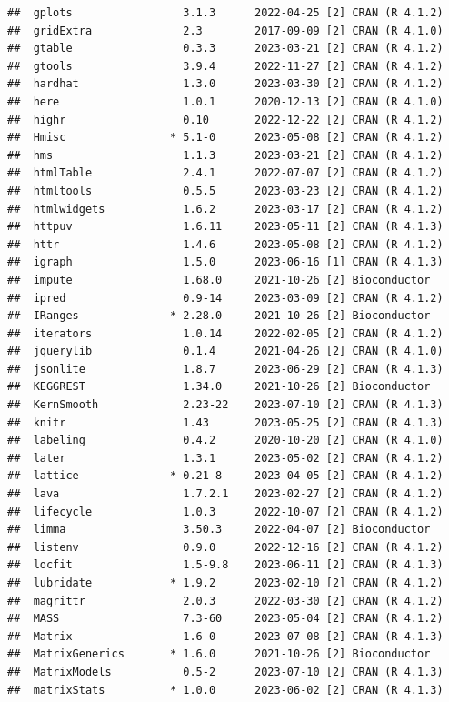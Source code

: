 \documentclass[
]{book}
\begin{document}
\begin{verbatim}
##  gplots                 3.1.3      2022-04-25 [2] CRAN (R 4.1.2)
##  gridExtra              2.3        2017-09-09 [2] CRAN (R 4.1.0)
##  gtable                 0.3.3      2023-03-21 [2] CRAN (R 4.1.2)
##  gtools                 3.9.4      2022-11-27 [2] CRAN (R 4.1.2)
##  hardhat                1.3.0      2023-03-30 [2] CRAN (R 4.1.2)
##  here                   1.0.1      2020-12-13 [2] CRAN (R 4.1.0)
##  highr                  0.10       2022-12-22 [2] CRAN (R 4.1.2)
##  Hmisc                * 5.1-0      2023-05-08 [2] CRAN (R 4.1.2)
##  hms                    1.1.3      2023-03-21 [2] CRAN (R 4.1.2)
##  htmlTable              2.4.1      2022-07-07 [2] CRAN (R 4.1.2)
##  htmltools              0.5.5      2023-03-23 [2] CRAN (R 4.1.2)
##  htmlwidgets            1.6.2      2023-03-17 [2] CRAN (R 4.1.2)
##  httpuv                 1.6.11     2023-05-11 [2] CRAN (R 4.1.3)
##  httr                   1.4.6      2023-05-08 [2] CRAN (R 4.1.2)
##  igraph                 1.5.0      2023-06-16 [1] CRAN (R 4.1.3)
##  impute                 1.68.0     2021-10-26 [2] Bioconductor
##  ipred                  0.9-14     2023-03-09 [2] CRAN (R 4.1.2)
##  IRanges              * 2.28.0     2021-10-26 [2] Bioconductor
##  iterators              1.0.14     2022-02-05 [2] CRAN (R 4.1.2)
##  jquerylib              0.1.4      2021-04-26 [2] CRAN (R 4.1.0)
##  jsonlite               1.8.7      2023-06-29 [2] CRAN (R 4.1.3)
##  KEGGREST               1.34.0     2021-10-26 [2] Bioconductor
##  KernSmooth             2.23-22    2023-07-10 [2] CRAN (R 4.1.3)
##  knitr                  1.43       2023-05-25 [2] CRAN (R 4.1.3)
##  labeling               0.4.2      2020-10-20 [2] CRAN (R 4.1.0)
##  later                  1.3.1      2023-05-02 [2] CRAN (R 4.1.2)
##  lattice              * 0.21-8     2023-04-05 [2] CRAN (R 4.1.2)
##  lava                   1.7.2.1    2023-02-27 [2] CRAN (R 4.1.2)
##  lifecycle              1.0.3      2022-10-07 [2] CRAN (R 4.1.2)
##  limma                  3.50.3     2022-04-07 [2] Bioconductor
##  listenv                0.9.0      2022-12-16 [2] CRAN (R 4.1.2)
##  locfit                 1.5-9.8    2023-06-11 [2] CRAN (R 4.1.3)
##  lubridate            * 1.9.2      2023-02-10 [2] CRAN (R 4.1.2)
##  magrittr               2.0.3      2022-03-30 [2] CRAN (R 4.1.2)
##  MASS                   7.3-60     2023-05-04 [2] CRAN (R 4.1.2)
##  Matrix                 1.6-0      2023-07-08 [2] CRAN (R 4.1.3)
##  MatrixGenerics       * 1.6.0      2021-10-26 [2] Bioconductor
##  MatrixModels           0.5-2      2023-07-10 [2] CRAN (R 4.1.3)
##  matrixStats          * 1.0.0      2023-06-02 [2] CRAN (R 4.1.3)

\end{verbatim}
\end{document}

